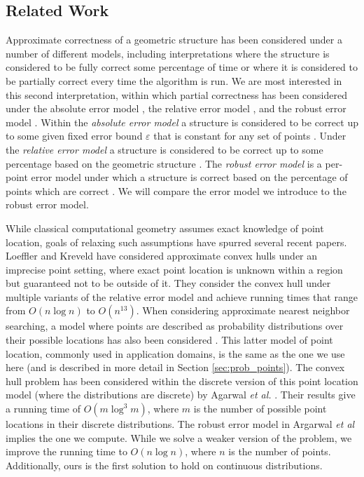 \documentclass[11pt]{article}
\begin{document}
\subsection{Related Work}

Approximate correctness of a geometric structure has been considered under a number of different models, including interpretations where the structure is considered to be fully correct some percentage of time or where it is considered to be partially correct every time the algorithm is run.  We are most interested in this second interpretation, within which partial correctness has been considered under the absolute error model \cite{Fonseca10Approximate}, the relative error model \cite{Arya00Approximate}, and the robust error model \cite{Rousseeuw05Robust}.
Within the \emph{absolute error model} a structure is considered to be correct up to some given fixed error bound $\varepsilon$ that is constant for any set of points \cite{Fonseca10Approximate}.   
Under the \emph{relative error model} a structure is considered to be correct up to some percentage based on the geometric structure \cite{Arya00Approximate}.
The \emph{robust error model} is a per-point error model under which a structure is correct based on the percentage of points which are correct \cite{Rousseeuw05Robust}.  We will compare the error model we introduce to the robust error model. 

While classical computational geometry assumes exact knowledge of point location, goals of relaxing such assumptions have spurred several recent papers.
Loeffler and Kreveld \cite{Loeffler10Imprecise} have considered approximate convex hulls under an imprecise point setting, where exact point location is unknown within a region but guaranteed not to be outside of it.  They consider the convex hull under multiple variants of the relative error model and achieve running times that range from $O(n \log n)$ to $O(n^{13})$.
When considering approximate nearest neighbor searching, a model where points are described as probability distributions over their possible locations has also been considered \cite{Agarwal13ANN}.  This latter model of point location, commonly used in application domains, is the same as the one we use here (and is described in more detail in Section \ref{sec:prob_points}).  The convex hull problem has been considered within the discrete version of this point location model (where the distributions are discrete) by Agarwal \textit{et al.} \cite{Agarwal14ConvexHulls}.  
Their results give a running time of $O(m \log^3 m)$, where $m$ is the number of possible point locations in their discrete distributions.  The robust error model in Argarwal \textit{et al} implies the one we compute.  While we solve a weaker version of the problem, we improve the running time to $O(n \log n)$, where $n$ is the number of points.  Additionally, ours is the first solution to hold on continuous distributions.  
\end{document}
